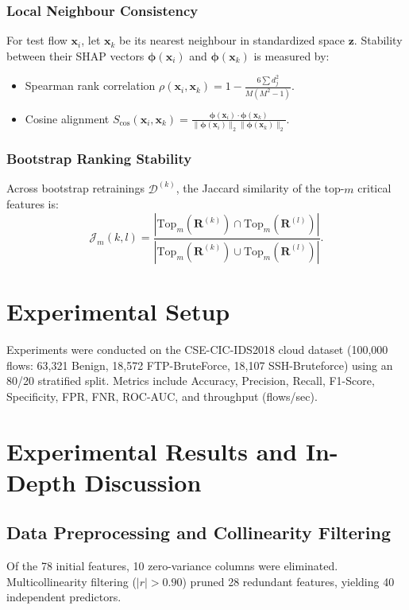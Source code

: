 \documentclass[conference]{IEEEtran}
\begin{document}
\subsubsection{Local Neighbour Consistency}
For test flow $\mathbf{x}_i$, let $\mathbf{x}_k$ be its nearest neighbour in standardized space $\mathbf{z}$. Stability between their SHAP vectors $\boldsymbol{\phi}(\mathbf{x}_i)$ and $\boldsymbol{\phi}(\mathbf{x}_k)$ is measured by:
\begin{itemize}
    \item Spearman rank correlation $\rho(\mathbf{x}_i, \mathbf{x}_k) = 1 - \frac{6 \sum d_j^2}{M(M^2 - 1)}$.
    \item Cosine alignment $S_{{\text{cos}}}(\mathbf{x}_i, \mathbf{x}_k) = \frac{{\boldsymbol{\phi}(\mathbf{x}_i) \cdot \boldsymbol{\phi}(\mathbf{x}_k)}}{{\|\boldsymbol{\phi}(\mathbf{x}_i)\|_2 \|\boldsymbol{\phi}(\mathbf{x}_k)\|_2}}$.
\end{itemize}

\subsubsection{Bootstrap Ranking Stability}
Across bootstrap retrainings $\mathcal{D}^{(k)}$, the Jaccard similarity of the top-$m$ critical features is:
\begin{equation}
\mathcal{J}_{m}(k, l) = \frac{{|\text{Top}_m(\mathbf{R}^{(k)}) \cap \text{Top}_m(\mathbf{R}^{(l)})|}}{{|\text{Top}_m(\mathbf{R}^{(k)}) \cup \text{Top}_m(\mathbf{R}^{(l)})|}}.
\end{equation}

\section{Experimental Setup}
Experiments were conducted on the CSE-CIC-IDS2018 cloud dataset (100,000 flows: 63,321 Benign, 18,572 FTP-BruteForce, 18,107 SSH-Bruteforce) using an 80/20 stratified split. Metrics include Accuracy, Precision, Recall, F1-Score, Specificity, FPR, FNR, ROC-AUC, and throughput (flows/sec).

\section{Experimental Results and In-Depth Discussion}

\subsection{Data Preprocessing and Collinearity Filtering}
Of the 78 initial features, 10 zero-variance columns were eliminated. Multicollinearity filtering ($|r| > 0.90$) pruned 28 redundant features, yielding 40 independent predictors.
\end{document}
